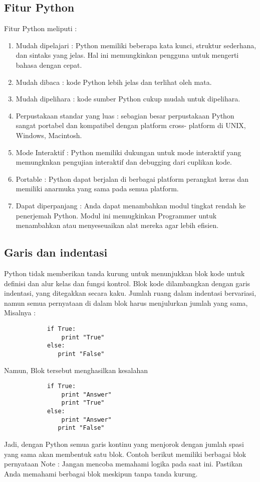 \subsection{Fitur Python}
Fitur Python meliputi :
    \begin{enumerate}
        \item Mudah dipelajari : Python memiliki beberapa kata kunci, struktur sederhana, dan sintaks yang jelas. Hal ini memungkinkan
        pengguna untuk mengerti bahasa dengan cepat.
        \item Mudah dibaca : kode Python lebih jelas dan terlihat oleh mata.
        \item Mudah dipelihara : kode sumber Python cukup mudah untuk dipelihara.
        \item Perpustakaan standar yang luas : sebagian besar perpustakaan Python sangat portabel dan kompatibel dengan platform cross-           platform di UNIX, Windows, Macintosh.
        \item Mode Interaktif : Python memiliki dukungan untuk mode interaktif yang memungknkan pengujian interaktif dan debugging dari         cuplikan kode.
        \item Portable : Python dapat berjalan di berbagai platform perangkat keras dan memiliki anarmuka yang sama pada semua platform.
        \item Dapat diperpanjang : Anda dapat menambahkan modul tingkat rendah ke penerjemah Python. Modul ini memugkinkan Programmer            untuk menambahkan atau menyeseuaikan alat mereka agar lebih efisien.
     \end{enumerate}

\subsection{Garis dan indentasi}
Python tidak memberikan tanda kurung untuk menunjukkan blok kode untuk definisi dan alur kelas dan fungsi
kontrol. Blok kode dilambangkan dengan garis indentasi, yang ditegakkan secara kaku.
Jumlah ruang dalam indentasi bervariasi, namun semua pernyataan di dalam blok harus
menjulurkan jumlah yang sama, Misalnya :
    \begin{verbatim}
            if True:
                print "True"
            else:
               print "False"
    \end{verbatim}
    
Namun, Blok tersebut menghasilkan kesalahan
    \begin{verbatim}
            if True:
                print "Answer"
                print "True"
            else:
                print "Answer"
               print "False"
    \end{verbatim}
Jadi, dengan Python semua garis kontinu yang menjorok dengan jumlah spasi yang sama akan membentuk satu blok. Contoh berikut memiliki berbagai blok pernyataan
Note : Jangan mencoba memahami logika pada saat ini. Pastikan Anda memahami berbagai blok meskipun tanpa tanda kurung.

